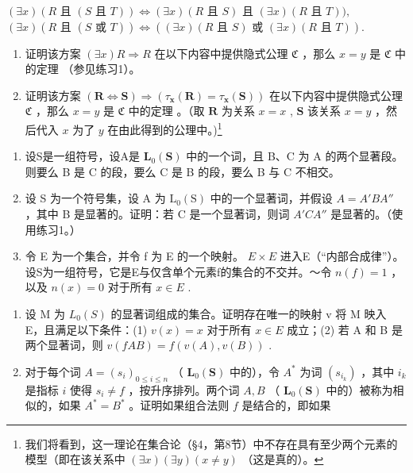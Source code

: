 \((\exists x)(R \text{ 且 } (S \text{ 且 } T)) \Longleftrightarrow (\exists x)(R \text{ 且 } S) \text{ 且 } (\exists x)(R \text{ 且 } T)),\) \((\exists x)(R \text{ 且 } (S \text{ 或 } T)) \Longleftrightarrow ((\exists x)(R \text{ 且 } S) \text{ 或 } (\exists x)(R \text{ 且 } T)).\)

\begin{enumerate}
\def\labelenumi{\arabic{enumi}.}
\setcounter{enumi}{5}
\item
  证明该方案 \((\exists x)R \Longrightarrow R\) 在以下内容中提供隐式公理 \(\mathfrak{C}\) ，那么 \(x = y\) 是 \(\mathfrak{C}\) 中的定理 （参见练习1）。
\item
  证明该方案 \((\pmb{R} \Longleftrightarrow \pmb{S}) \Longrightarrow (\tau_{\pmb{x}}(\pmb{R}) = \tau_{\pmb{x}}(\pmb{S}))\) 在以下内容中提供隐式公理 \(\mathfrak{C}\) ，那么 \(x = y\) 是 \(\mathfrak{C}\) 中的定理 。（取 \(\pmb{R}\) 为关系 \(x = x\) , \(\pmb{S}\) 该关系 \(x = y\) ，然后代入 \(x\) 为了 \(y\) 在由此得到的公理中。)\footnote{我们将看到，这一理论在集合论（§4，第8节）中不存在具有至少两个元素的模型（即在该关系中 \((\exists x)(\exists y)(x \neq y)\) （这是真的）。}
\end{enumerate}

\appendixexercisegroup

\begin{enumerate}
\def\labelenumi{\arabic{enumi}.}
\item
  设S是一组符号，设A是 \(\mathbf{L}_{0}(\mathbf{S})\) 中的一个词，且 B、C 为 A 的两个显著段。则要么 B 是 C 的段，要么 C 是 B 的段，要么 B 与 C 不相交。
\item
  设 S 为一个符号集，设 A 为 \(\mathrm{L}_{0}(\mathrm{S})\) 中的一个显著词，并假设 \(A = A'BA''\) ，其中 B 是显著的。证明：若 C 是一个显著词，则词 \(A'CA''\) 是显著的。（使用练习1。）
\item
  令 E 为一个集合，并令 f 为 E 的一个映射。 \(E \times E\) 进入E（“内部合成律”）。设S为一组符号，它是E与仅含单个元素f的集合的不交并。～令 \(n(f) = 1\) ，以及 \(n(x) = 0\) 对于所有 \(x \in E\) .
\end{enumerate}

\begin{enumerate}
\def\labelenumi{(\alph{enumi})}
\item
  设 M 为 \(L_{0}(S)\) 的显著词组成的集合。证明存在唯一的映射 v 将 M 映入 E，且满足以下条件：(1) \(v(x) = x\) 对于所有 \(x \in E\) 成立；(2) 若 A 和 B 是两个显著词，则 \(v(fAB) = f(v(A), v(B))\) .
\item
  对于每个词 \(A = (s_i)_{0 \leqslant i \leqslant n}\) （ \(\mathbf{L}_0(\mathbf{S})\) 中的），令 \(A^*\) 为词 \((s_{i_k})\) ，其中 \(i_k\) 是指标 \(i\) 使得 \(s_i \neq f\) ，按升序排列。两个词 \(A, B\) （ \(\mathbf{L}_0(\mathbf{S})\) 中的）被称为相似的，如果 \(A^* = B^*\) 。证明如果组合法则 \(f\) 是结合的，即如果
\end{enumerate}

